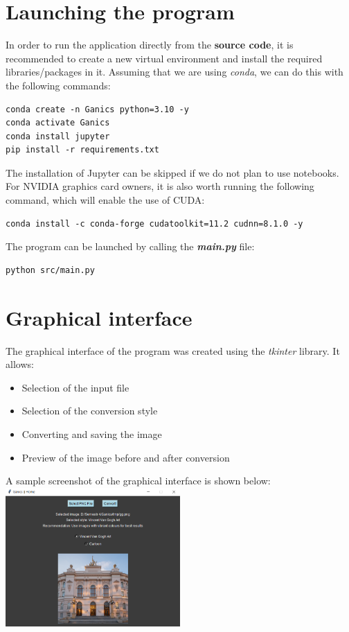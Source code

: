 \documentclass{article}
\begin{document}
\section{Launching the program}
In order to run the application directly from the \textbf{source code}, it is recommended to create a new virtual environment and install the required libraries/packages in it.
Assuming that we are using \textit{conda}, we can do this with the following commands:
\begin{verbatim}
conda create -n Ganics python=3.10 -y
conda activate Ganics
conda install jupyter
pip install -r requirements.txt
\end{verbatim}
The installation of Jupyter can be skipped if we do not plan to use notebooks.
\vspace{3mm} \\
For NVIDIA graphics card owners, it is also worth running the following command, which will enable the use of CUDA:
\begin{verbatim}
conda install -c conda-forge cudatoolkit=11.2 cudnn=8.1.0 -y
\end{verbatim}
The program can be launched by calling the \textbf{\textit{main.py}} file:
\begin{verbatim}
python src/main.py
\end{verbatim}

\section{Graphical interface}
The graphical interface of the program was created using the \textit{tkinter} library. It allows:
\begin{itemize}
    \setlength\itemsep{0pt}
    \item Selection of the input file
    \item Selection of the conversion style
    \item Converting and saving the image
    \item Preview of the image before and after conversion
\end{itemize}
A sample screenshot of the graphical interface is shown below:
\vspace{3mm} \\
\includegraphics[width=0.5\textwidth]{../imgs/gui.png}
\end{document}
